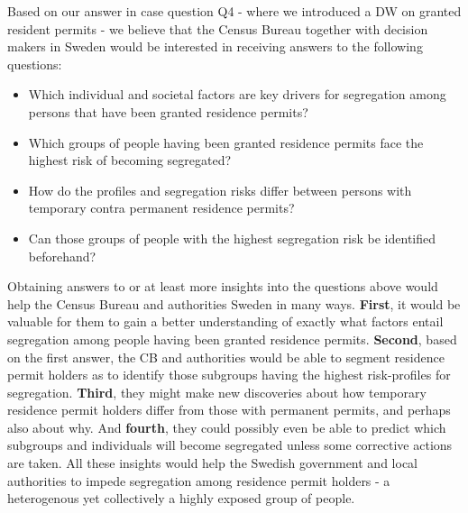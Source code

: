 Based on our answer in case question Q4 - where we introduced a DW on granted resident permits - 
we believe that the Census Bureau together with decision makers in Sweden would be interested in 
receiving answers to the following questions: 
\begin{itemize}
  \item Which individual and societal factors are key drivers for segregation among persons that have been granted residence permits? 
  \item Which groups of people having been granted residence permits face the highest risk of becoming segregated? 
  \item How do the profiles and segregation risks differ between persons with temporary contra permanent residence permits? 
  \item Can those groups of people with the highest segregation risk be identified beforehand? 
\end{itemize}

Obtaining answers to or at least more insights into the questions above would help the Census Bureau and authorities Sweden in many ways.
\textbf{First}, it would be valuable for them to gain a better understanding of exactly what factors entail segregation among people 
having been granted residence permits. 
\textbf{Second}, based on the first answer, 
the CB and authorities would be able to segment residence permit holders as to identify those subgroups having 
the highest risk-profiles for segregation. 
\textbf{Third}, they might make new discoveries about how temporary residence permit holders differ from those with permanent permits, 
and perhaps also about why. And \textbf{fourth}, they could possibly even be able to predict which subgroups and individuals will 
become segregated unless some corrective actions are taken. 
All these insights would help the Swedish government and local authorities to impede segregation among residence permit holders - 
a heterogenous yet collectively a highly exposed group of people.  

